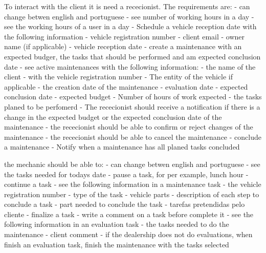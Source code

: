 To interact with the client it is need a rececionist. The requirements are:
- can change betwen english and portuguese
- see number of working hours in a day 
- see the working hours of a user in a day 
- Schedule a vehicle reception date with the following information
  - vehicle registration number
  - client email
  - owner name (if applicable)
  - vehicle reception date
- create a maintenance with an expected budger, the tasks that should be performed and am expected conclusion date
- see active maintenances with the following information:
  - the name of the client
  - with the vehicle registration number
  - The entity of the vehicle if applicable
  - the creation date of the maintenance
  - evaluation date
  - expected conclusion date
  - expected budget
  - Number of hours of work expected
  - the tasks planed to be perfomerd
- The rececionist should receive a notification if there is a change in the expected budget or the expected conclusion date of the maintenance
- the rececionist should be able to confirm or reject changes of the maintenance
- the rececionist should be able to cancel the maintenance
- conclude a maintenance
- Notify when a maintenance has all planed tasks concluded 

the mechanic should be able to:
- can change betwen english and portuguese
- see the tasks needed for todays date
- pause a task, for per example, lunch hour
- continue a task
- see the following information in a maintenance task 
  - the vehicle registration number
  - type of the task
  - vehicle parts
  - description of each step to conclude a task
  - part needed to conclude the task
  - tarefas pretendidas pelo cliente
- finalize a task
- write a comment on a task before complete it 
- see the following information in an evaluation task
  - the tasks needed to do the maintenance
  - client comment
- if the dealership does not do evaluations, when finish an evaluation task, finish the maintenance with the tasks selected

